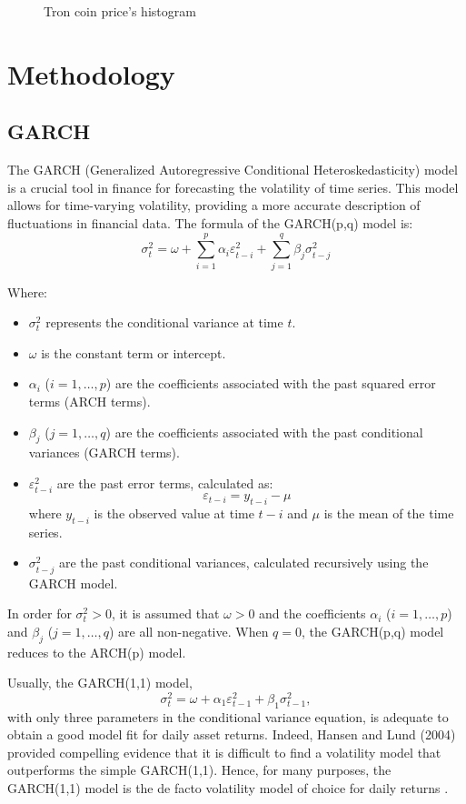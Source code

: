 \documentclass{ieeeojies}
\begin{document}
\begin{figure}[H]
\begin{minipage}{0.23\textwidth}
    \caption{Tron coin price's histogram}
    \label{fig:6}
  \end{minipage}
\end{figure}

\section{Methodology}

\subsection{GARCH}
The GARCH (Generalized Autoregressive Conditional Heteroskedasticity) model is a crucial tool in finance for forecasting
the volatility of time series. This model allows for time-varying volatility, providing
a more accurate description of fluctuations in financial data. The formula of the GARCH(p,q) model is:
\[
  \sigma^2_t = \omega + \sum_{i=1}^{p} \alpha_i \varepsilon^2_{t-i} + \sum_{j=1}^{q} \beta_j \sigma^2_{t-j}
\]

Where:
\begin{itemize}
  \item \(\sigma^2_t\) represents the conditional variance at time \(t\).
  \item \(\omega\) is the constant term or intercept.
  \item \(\alpha_i\) (\(i=1, \ldots, p\)) are the coefficients associated with the past squared error terms (ARCH terms).
  \item \(\beta_j\) (\(j=1, \ldots, q\)) are the coefficients associated with the past conditional variances (GARCH terms).
  \item \(\varepsilon^2_{t-i}\) are the past error terms, calculated as:
        \[
          \varepsilon_{t-i} = y_{t-i} - \mu
        \]
        where \(y_{t-i}\) is the observed value at time \(t-i\) and \(\mu\) is the mean of the time series.
  \item \(\sigma^2_{t-j}\) are the past conditional variances, calculated recursively using the GARCH model.
\end{itemize}

In order for \(\sigma^2_t > 0\), it is assumed that \(\omega > 0\) and the coefficients \(\alpha_i\) (\(i=1, \ldots, p\)) and \(\beta_j\) (\(j=1, \ldots, q\)) are all non-negative.
When \(q=0\), the GARCH(p,q) model reduces to the ARCH(p) model.

Usually, the GARCH(1,1) model,
\[
  \sigma^2_t = \omega + \alpha_1 \varepsilon^2_{t-1} + \beta_1 \sigma^2_{t-1},
\]
with only three parameters in the conditional variance equation, is adequate to obtain a good model fit for daily asset returns. Indeed, Hansen and Lund (2004) provided compelling evidence that it is difficult to find a volatility model that outperforms the simple GARCH(1,1). Hence, for many purposes, the GARCH(1,1) model is the de facto volatility model of choice for daily returns \cite{b1}.
\end{document}

